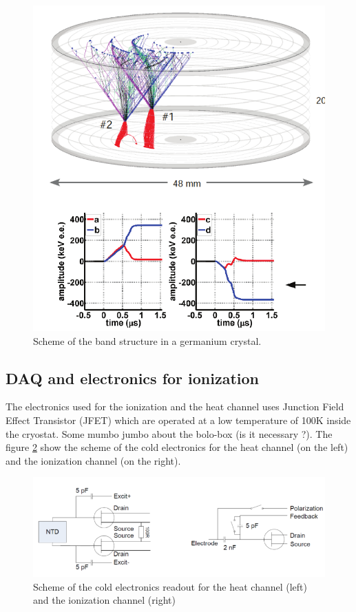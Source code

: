 \begin{figure}
\centering
\includegraphics[height=0.5\textheight]{Figures/Electrodes/charge_drifting.pdf}
\caption{Scheme of the band structure in a germanium crystal.}
\label{fig:charge-drifting}
\end{figure}


\subsection{DAQ and electronics for ionization}

The electronics used for the ionization and the heat channel uses Junction Field Effect Transistor (JFET) which are operated at a low temperature of 100K inside the cryostat.
Some mumbo jumbo about the bolo-box (is it necessary ?).
The figure \ref{fig:electronics-scheme} show the scheme of the cold electronics for the heat channel (on the left) and the ionization channel (on the right).

\begin{figure}
\centering
\includegraphics[width=\textwidth]{Figures/Electrodes/electronics_scheme.pdf}
\caption{Scheme of the cold electronics readout for the heat channel (left) and the ionization channel (right)}
\label{fig:electronics-scheme}
\end{figure}

